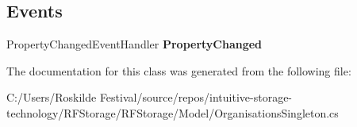 \subsection*{Events}
\begin{DoxyCompactItemize}
\item 
\mbox{\label{class_r_f_storage_1_1_model_1_1_organisations_singleton_aa8d2d526d9cc843d834db22528a9564d}} 
Property\+Changed\+Event\+Handler {\bfseries Property\+Changed}
\end{DoxyCompactItemize}


The documentation for this class was generated from the following file\+:\begin{DoxyCompactItemize}
\item 
C\+:/\+Users/\+Roskilde Festival/source/repos/intuitive-\/storage-\/technology/\+R\+F\+Storage/\+R\+F\+Storage/\+Model/Organisations\+Singleton.\+cs\end{DoxyCompactItemize}
